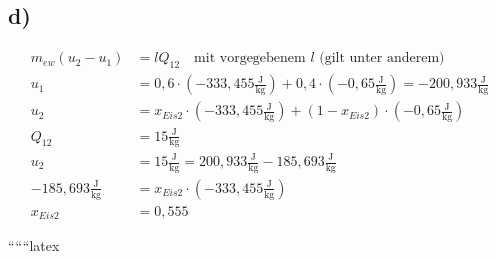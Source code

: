 

\subsection*{d)}
\begin{align*}
    m_{ew} (u_2 - u_1) &= l Q_{12} \quad \text{mit vorgegebenem } l \text{ (gilt unter anderem)} \\
    u_1 &= 0,6 \cdot (-333,455 \frac{\text{J}}{\text{kg}}) + 0,4 \cdot (-0,65 \frac{\text{J}}{\text{kg}}) = -200,933 \frac{\text{J}}{\text{kg}} \\
    u_2 &= x_{Eis2} \cdot (-333,455 \frac{\text{J}}{\text{kg}}) + (1 - x_{Eis2}) \cdot (-0,65 \frac{\text{J}}{\text{kg}}) \\
    Q_{12} &= 15 \frac{\text{J}}{\text{kg}} \\
    u_2 &= 15 \frac{\text{J}}{\text{kg}} = 200,933 \frac{\text{J}}{\text{kg}} - 185,693 \frac{\text{J}}{\text{kg}} \\
    -185,693 \frac{\text{J}}{\text{kg}} &= x_{Eis2} \cdot (-333,455 \frac{\text{J}}{\text{kg}}) \\
    x_{Eis2} &= 0,555
\end{align*}

``````latex